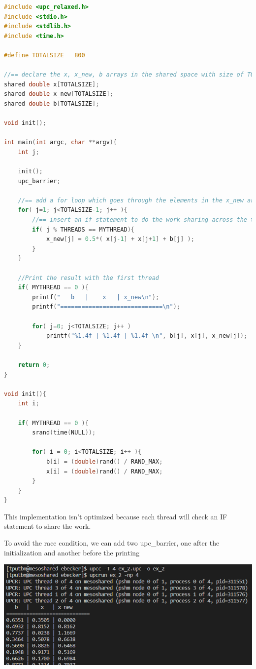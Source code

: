 \documentclass{report}
\begin{document}
\begin{lstlisting}[language=C]
#include <upc_relaxed.h>
#include <stdio.h>
#include <stdlib.h>
#include <time.h>

#define TOTALSIZE 	800

//== declare the x, x_new, b arrays in the shared space with size of TOTALSIZE
shared double x[TOTALSIZE];
shared double x_new[TOTALSIZE];
shared double b[TOTALSIZE];

void init();

int main(int argc, char **argv){
    int j;

    init();
    upc_barrier;

    //== add a for loop which goes through the elements in the x_new array
    for( j=1; j<TOTALSIZE-1; j++ ){
        //== insert an if statement to do the work sharing across the threads
        if( j % THREADS == MYTHREAD){
            x_new[j] = 0.5*( x[j-1] + x[j+1] + b[j] );
        }
    }

    //Print the result with the first thread
    if( MYTHREAD == 0 ){
        printf("   b   |    x   | x_new\n");
        printf("=============================\n");

        for( j=0; j<TOTALSIZE; j++ )
            printf("%1.4f | %1.4f | %1.4f \n", b[j], x[j], x_new[j]);
    }

    return 0;
}

void init(){
    int i;

    if( MYTHREAD == 0 ){
        srand(time(NULL));

        for( i = 0; i<TOTALSIZE; i++ ){
            b[i] = (double)rand() / RAND_MAX;
            x[i] = (double)rand() / RAND_MAX;
        }
    }
}

\end{lstlisting}

This implementation isn't optimized because each thread will check an IF statement to share the work. 

To avoid the race condition, we can add two upc\_barrier, one after the initialization and another before the printing

\begin{center}
    \includegraphics[scale=0.75]{Images/1rst_output.png}
    \label{fig3}
\end{center}
\end{document}

